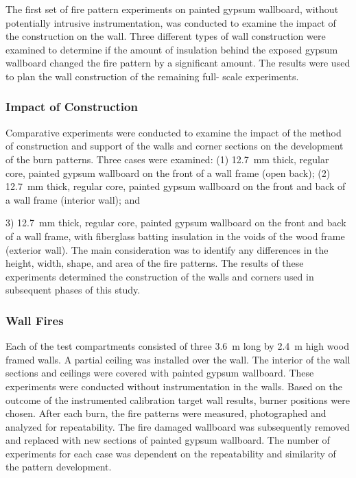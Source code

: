 \documentclass[twoside]{uocthesis}
\begin{document}
The first set of fire pattern experiments on painted gypsum wallboard, without potentially intrusive instrumentation, was conducted to examine the impact of the construction on the wall. Three different types of wall construction were examined to determine if the amount of insulation behind the exposed gypsum wallboard changed the fire pattern by a significant amount.  The results were used to plan the wall construction of the remaining full- scale experiments. 

\subsubsection{Impact of Construction}

Comparative experiments were conducted to examine the impact of the method of construction and support of the walls and corner sections on the development of the burn patterns.  Three cases were examined: (1) 12.7~mm thick, regular core, painted gypsum wallboard on the front of a wall frame (open back); (2) 12.7~mm thick, regular core, painted gypsum wallboard on the front and back of a wall frame (interior wall); and {3) 12.7~mm thick, regular core, painted gypsum wallboard on the front and back of a wall frame, with fiberglass batting insulation in the voids of the wood frame (exterior wall).  The main consideration was to identify any differences in the height, width, shape, and area of the fire patterns. The results of these experiments determined the construction of the walls and corners used in subsequent phases of this study.

\subsubsection{Wall Fires}

Each of the test compartments consisted of three 3.6~m long by 2.4~m high wood framed walls. A partial ceiling was installed over the wall. The interior of the wall sections and ceilings were covered with painted gypsum wallboard.  These experiments were conducted without instrumentation in the walls.  Based on the outcome of the instrumented calibration target wall results, burner positions were chosen. After each burn, the fire patterns were measured, photographed and analyzed for repeatability. The fire damaged wallboard was subsequently removed and replaced with new sections of painted gypsum wallboard. The number of experiments for each case was dependent on the repeatability and similarity of the pattern development.

}
\end{document}
